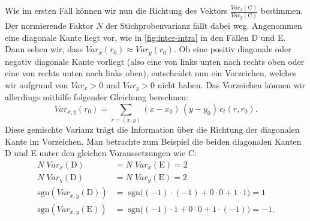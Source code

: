 \documentclass[a4paper, 11pt]{report}
\theoremstyle{definition}
\begin{document}
 			Wie im ersten Fall können wir nun die Richtung des Vektors $\frac{Var_x(\text{C})}{Var_y(\text{C})}$ bestimmen. Der normierende Faktor $N$ der Stichprobenvarianz fällt dabei weg. Angenommen eine diagonale Kante liegt vor, wie in \ref{fig:inter-intra} in den Fällen D und E.
 			Dann sehen wir, dass $Var_x(r_0) \approx Var_y(r_0)$. Ob eine \glqq positiv diagonale\grqq{} oder \glqq negativ diagonale\grqq{} Kante vorliegt (also eine von links unten nach rechts oben oder eine von rechts unten nach links oben), entscheidet nun ein Vorzeichen, welches wir aufgrund von $Var_x > 0$ und $Var_y > 0$ nicht haben.
 			Das Vorzeichen können wir allerdings mithilfe folgender Gleichung berechnen:
 			$$ Var_{x,y}(r_0) = \sum_{r=(x,y)} (x-x_0) \, (y-y_0) \, c_t(r,r_0).$$
 			Diese \glqq gemischte Varianz\grqq{} trägt die Information über die Richtung der diagonalen Kante im Vorzeichen.
 			Man betrachte zum Beispiel die beiden diagonalen Kanten D und E unter den gleichen Voraussetzungen wie C:
 			 \begin{align*}
 				N \; Var_x(\text{D}) &= N \; Var_x(\text{E}) = 2 \\
 				N \; Var_y(\text{D}) &= N \; Var_y(\text{E}) = 2 \\
 				\text{sgn}(Var_{x,y}(\text{D})) 	&=\;\text{sgn}\bigg((-1) \cdot (-1)+ 0 \cdot 0 +1 \cdot 1\bigg) = 1\\
 				\text{sgn}(Var_{x,y}(\text{E}))		&=\;\text{sgn}\bigg((-1) \cdot 1+ 0 \cdot 0 +1 \cdot (-1)\bigg) = -1.\\
 			\end{align*}
 			
\end{document}

